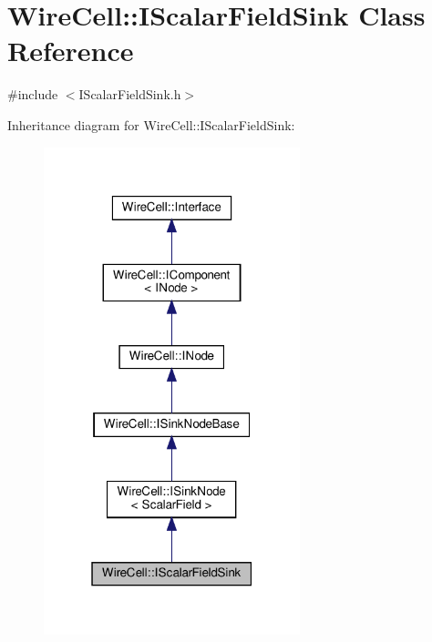 \hypertarget{class_wire_cell_1_1_i_scalar_field_sink}{}\section{Wire\+Cell\+:\+:I\+Scalar\+Field\+Sink Class Reference}
\label{class_wire_cell_1_1_i_scalar_field_sink}


{\ttfamily \#include $<$I\+Scalar\+Field\+Sink.\+h$>$}



Inheritance diagram for Wire\+Cell\+:\+:I\+Scalar\+Field\+Sink\+:
\nopagebreak
\begin{figure}[H]
\begin{center}
\leavevmode
\includegraphics[width=211pt]{class_wire_cell_1_1_i_scalar_field_sink__inherit__graph}
\end{center}
\end{figure}



